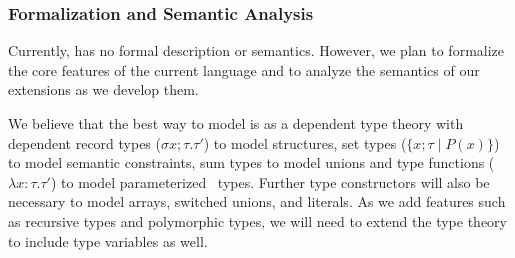 \documentclass[11pt]{article}
\begin{document}

% 


\subsubsection{Formalization and Semantic Analysis}

Currently, \pads{} has no formal description or semantics. However,
we plan to formalize the core features of the current language
and to analyze the semantics of our extensions as we develop them.

We believe that the best way to model \pads{} is as a dependent
type theory with dependent record types ($\sigma x;\tau.\tau'$) to model
\pads{} structures, set types ($\{x;\tau \; | \; P(x) \}$) to model
semantic constraints, sum types to model unions and type functions
($\lambda x{:}\tau.\tau'$) to model parameterized \pads{}\ types.  Further
type constructors will also be necessary to model arrays, switched unions,
and literals.  As we add features such as recursive types and 
polymorphic types, we will need to extend the type theory to include
type variables as well.
\end{document}
